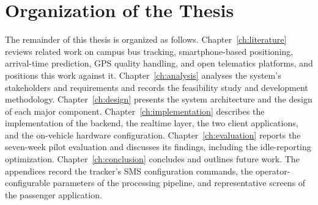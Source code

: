 \section{Organization of the Thesis}
The remainder of this thesis is organized as follows.
Chapter~\ref{ch:literature} reviews related work on campus bus tracking,
smartphone-based positioning, arrival-time prediction, GPS quality
handling, and open telematics platforms, and positions this work against
it. Chapter~\ref{ch:analysis} analyses the system's stakeholders and
requirements and records the feasibility study and development
methodology. Chapter~\ref{ch:design} presents the system architecture and
the design of each major component. Chapter~\ref{ch:implementation}
describes the implementation of the backend, the realtime layer, the two
client applications, and the on-vehicle hardware configuration.
Chapter~\ref{ch:evaluation} reports the seven-week pilot evaluation and
discusses its findings, including the idle-reporting optimization.
Chapter~\ref{ch:conclusion} concludes and outlines future work. The
appendices record the tracker's SMS configuration commands, the
operator-configurable parameters of the processing pipeline, and
representative screens of the passenger application.
